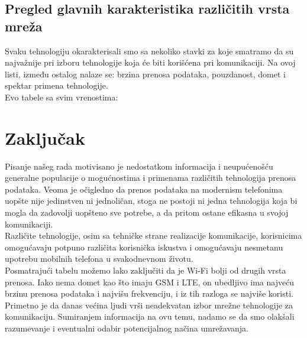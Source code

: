 \documentclass[a4paper]{article}
\begin{document}
\subsection{Pregled glavnih karakteristika različitih vrsta mreža}
Svaku tehnologiju okarakterisali smo sa nekoliko stavki za koje smatramo da su najvažnije pri izboru tehnologije koja će biti korišćena pri komunikaciji. Na ovoj listi, između ostalog nalaze se: brzina prenosa podataka, pouzdanost, domet i spektar primena tehnologije.\\
Evo tabele sa svim vrenostima:\\
\begin{center}
  \end{center}

\section{Zaključak}
Pisanje našeg rada motivisano je nedostatkom informacija i neupućenošću generalne populacije o mogućnostima i primenama različitih tehnologija prenosa podataka. Veoma je očigledno da prenos podataka na modernism telefonima uopšte nije jedinstven ni jednoličan, stoga ne postoji ni jedna tehnologija koja bi mogla da zadovolji uopšteno sve potrebe, a da pritom ostane efikasna u svojoj komunikaciji.\\
Različite tehnologije, osim sa tehničke strane realizacije komunikacije, korisnicima omogućavaju potpuno različita korisnička iskustva i omogućavaju nesmetanu upotrebu mobilnih telefona u svakodnevnom životu.\\
Posmatrajući tabelu možemo lako zaključiti da je Wi-Fi bolji od drugih vrsta prenosa. Iako nema domet kao što imaju GSM i LTE, on ubedljivo ima najveću brzinu prenosa podataka i najvišu frekvenciju, i iz tih razloga se najviše koristi.
Primetno je da danas većina ljudi vrši neadekvatan izbor mrežne tehnologije za komunikaciju. Sumiranjem informacija na ovu temu, nadamo se da smo olakšali razumevanje i eventualni odabir potencijalnog načina umrežavanja. 
\end{document}
